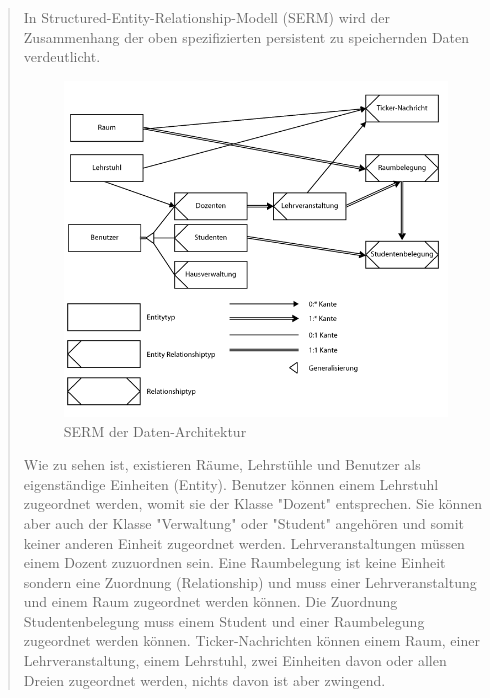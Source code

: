 \begin{quote}
In Structured-Entity-Relationship-Modell (SERM) wird der Zusammenhang der oben spezifizierten persistent zu speichernden Daten verdeutlicht. \\

\begin{figure}
\includegraphics[scale=0.70]{./images/section_5/dbserm}
\caption{SERM der Daten-Architektur}
\label{fig:dbserm}
\end{figure}

Wie zu sehen ist, existieren Räume, Lehrstühle und Benutzer als eigenständige Einheiten (Entity). Benutzer können einem Lehrstuhl zugeordnet werden, womit sie der Klasse "Dozent" entsprechen. Sie können aber auch der Klasse "Verwaltung" oder "Student" angehören und somit keiner anderen Einheit zugeordnet werden. Lehrveranstaltungen müssen einem Dozent zuzuordnen sein. Eine Raumbelegung ist keine Einheit sondern eine Zuordnung (Relationship) und muss einer Lehrveranstaltung und einem Raum zugeordnet werden können. Die Zuordnung Studentenbelegung muss einem Student und einer Raumbelegung zugeordnet werden können. Ticker-Nachrichten können einem Raum, einer Lehrveranstaltung, einem Lehrstuhl, zwei Einheiten davon oder allen Dreien zugeordnet werden, nichts davon ist aber zwingend. \\


\end{quote}